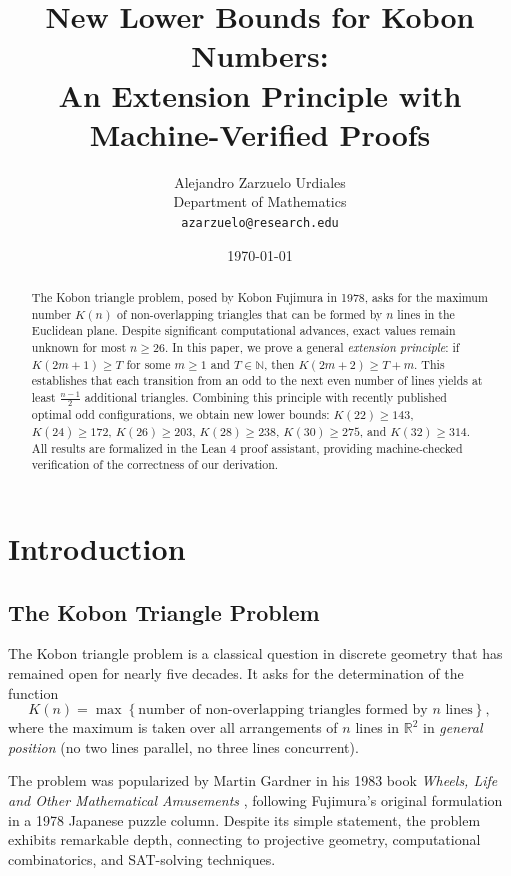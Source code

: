 \documentclass[11pt,a4paper]{article}
\title{New Lower Bounds for Kobon Numbers:\\
An Extension Principle with Machine-Verified Proofs}
\author{
  Alejandro Zarzuelo Urdiales\\[0.5em]
  \normalsize Department of Mathematics\\
  \normalsize \texttt{azarzuelo@research.edu}
}
\date{\today}
\theoremstyle{plain}
\theoremstyle{definition}
\theoremstyle{remark}
\newcommand{\K}{K}
\newcommand{\R}{\mathbb{R}}
\newcommand{\N}{\mathbb{N}}
\begin{document}
\maketitle

\begin{abstract}
The Kobon triangle problem, posed by Kobon Fujimura in 1978, asks for the maximum number $\K(n)$ of non-overlapping triangles that can be formed by $n$ lines in the Euclidean plane. Despite significant computational advances, exact values remain unknown for most $n \geq 26$. In this paper, we prove a general \emph{extension principle}: if $\K(2m+1) \geq T$ for some $m \geq 1$ and $T \in \N$, then $\K(2m+2) \geq T + m$. This establishes that each transition from an odd to the next even number of lines yields at least $\frac{n-1}{2}$ additional triangles. Combining this principle with recently published optimal odd configurations, we obtain new lower bounds: $\K(22) \geq 143$, $\K(24) \geq 172$, $\K(26) \geq 203$, $\K(28) \geq 238$, $\K(30) \geq 275$, and $\K(32) \geq 314$. All results are formalized in the Lean 4 proof assistant, providing machine-checked verification of the correctness of our derivation.
\end{abstract}

\tableofcontents

\section{Introduction}

\subsection{The Kobon Triangle Problem}

The Kobon triangle problem is a classical question in discrete geometry that has remained open for nearly five decades. It asks for the determination of the function
\[
\K(n) = \max \left\{ \text{number of non-overlapping triangles formed by } n \text{ lines} \right\},
\]
where the maximum is taken over all arrangements of $n$ lines in $\R^2$ in \emph{general position} (no two lines parallel, no three lines concurrent).

The problem was popularized by Martin Gardner in his 1983 book \textit{Wheels, Life and Other Mathematical Amusements} \cite{gardner1983wheels}, following Fujimura's original formulation in a 1978 Japanese puzzle column. Despite its simple statement, the problem exhibits remarkable depth, connecting to projective geometry, computational combinatorics, and SAT-solving techniques.
\end{document}
